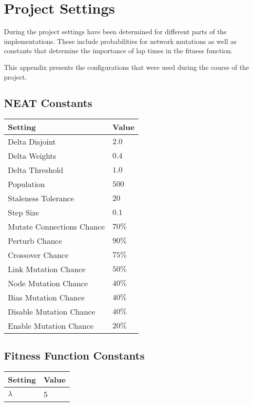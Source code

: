 \chapter{Project Settings}
\label{appendix:project_settings}
During the project settings have been determined for different parts of the implementations. These include probabilities for network mutations as well as constants that determine the importance of lap times in the fitness function.

This appendix presents the configurations that were used during the course of the project.

\section {NEAT Constants}
\label{appendix:project_settings:neat_constants}
\begin{table}[h!] 
  \centering
  \begin{tabular}{ll}
    \toprule
    Setting & Value\\
    \midrule
    Delta Disjoint & $2.0$ \\
    Delta Weights & $0.4$ \\
    Delta Threshold & $1.0$ \\
    \midrule
    Population & $500$ \\
    Staleness Tolerance & $20$ \\
    Step Size & $0.1$ \\
    \midrule
    Mutate Connections Chance & $70\%$ \\
    Perturb Chance & $90\%$ \\
    Crossover Chance & $75\%$ \\
    Link Mutation Chance & $50\%$ \\
    Node Mutation Chance & $40\%$ \\
    Bias Mutation Chance & $40\%$ \\
    Disable Mutation Chance & $40\%$ \\
    Enable Mutation Chance & $20\%$ \\
    \bottomrule
  \end{tabular}
  \label{tab:neat_config_table}
\end{table}

\section {Fitness Function Constants}
\label{appendix:project_settings:fitness_function_constants}
\begin{table}[h!] 
  \centering
  \begin{tabular}{ll}
    \toprule
    Setting & Value\\
    \midrule
    $\lambda$ & 5 \\
    \bottomrule
  \end{tabular}
  \label{tab:fitness_function_config_table}
\end{table}